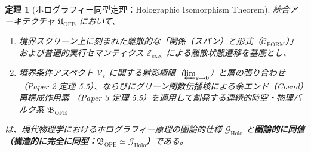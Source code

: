 \documentclass[11pt,a4paper]{ltjsarticle}
\theoremstyle{definition}
\theoremstyle{plain}
\newtheorem{theorem}{定理}[section]
\begin{document}
\begin{theorem}[ホログラフィー同型定理：Holographic Isomorphism Theorem]
統合アーキテクチャ $\mathfrak{U}_{\mathrm{OFE}}$ において、
\begin{enumerate}
    \item 境界スクリーン上に刻まれた離散的な「関係（スパン）と形式（$\mathcal{C}_{\mathrm{FORM}}$）」および普遍的実行セマンティクス $\mathcal{E}_{\mathrm{exec}}$ による離散状態遷移を基底とし、
    \item 境界条件アスペクト $\mathcal{V}_{\varepsilon}$ に関する射影極限（$\varprojlim_{\varepsilon \to 0}$）と層の張り合わせ（Paper 2 \cite{Ota2026_2} 定理 5.5）、ならびにグリーン関数伝播核による余エンド（Coend）再構成作用素 \cite{MacLane1998}（Paper 3 \cite{Ota2026_3} 定理 5.5）を適用して創発する連続的時空・物理バルク系 $\mathfrak{B}_{\mathrm{OFE}}$
\end{enumerate}
は、現代物理学におけるホログラフィー原理の圏論的仕様 $\mathcal{G}_{\mathrm{Holo}}$ と\textbf{圏論的に同値（構造的に完全に同型：$\mathfrak{B}_{\mathrm{OFE}} \simeq \mathcal{G}_{\mathrm{Holo}}$）}である。
\end{theorem}
\end{document}
